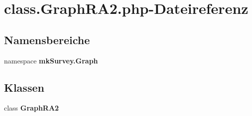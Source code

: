 \section{class.GraphRA2.php-Dateireferenz}
\label{class_8GraphRA2_8php}
\subsection*{Namensbereiche}
\begin{CompactItemize}
\item 
namespace {\bf mkSurvey.Graph}
\end{CompactItemize}
\subsection*{Klassen}
\begin{CompactItemize}
\item 
class {\bf GraphRA2}
\end{CompactItemize}
